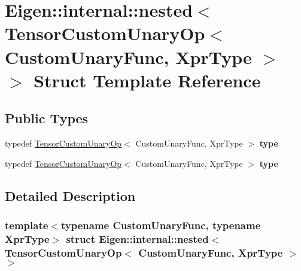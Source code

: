 \hypertarget{struct_eigen_1_1internal_1_1nested_3_01_tensor_custom_unary_op_3_01_custom_unary_func_00_01_xpr_type_01_4_01_4}{}\section{Eigen\+:\+:internal\+:\+:nested$<$ Tensor\+Custom\+Unary\+Op$<$ Custom\+Unary\+Func, Xpr\+Type $>$ $>$ Struct Template Reference}
\label{struct_eigen_1_1internal_1_1nested_3_01_tensor_custom_unary_op_3_01_custom_unary_func_00_01_xpr_type_01_4_01_4}
\subsection*{Public Types}
\begin{DoxyCompactItemize}
\item 
\mbox{\label{struct_eigen_1_1internal_1_1nested_3_01_tensor_custom_unary_op_3_01_custom_unary_func_00_01_xpr_type_01_4_01_4_a0cd94968503c87726bbc162053a28a5c}} 
typedef \hyperlink{class_eigen_1_1_tensor_custom_unary_op}{Tensor\+Custom\+Unary\+Op}$<$ Custom\+Unary\+Func, Xpr\+Type $>$ {\bfseries type}
\item 
\mbox{\label{struct_eigen_1_1internal_1_1nested_3_01_tensor_custom_unary_op_3_01_custom_unary_func_00_01_xpr_type_01_4_01_4_a0cd94968503c87726bbc162053a28a5c}} 
typedef \hyperlink{class_eigen_1_1_tensor_custom_unary_op}{Tensor\+Custom\+Unary\+Op}$<$ Custom\+Unary\+Func, Xpr\+Type $>$ {\bfseries type}
\end{DoxyCompactItemize}


\subsection{Detailed Description}
\subsubsection*{template$<$typename Custom\+Unary\+Func, typename Xpr\+Type$>$\newline
struct Eigen\+::internal\+::nested$<$ Tensor\+Custom\+Unary\+Op$<$ Custom\+Unary\+Func, Xpr\+Type $>$ $>$}



